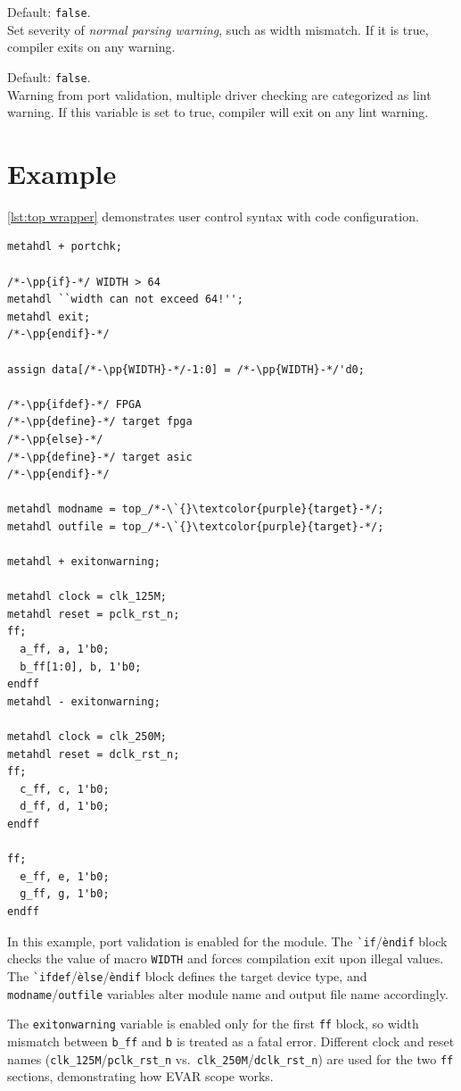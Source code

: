 \begin{description}[style=nextline,leftmargin=2em]
\item[\texttt{exitonwarning}\hfill EVAR\,/\,boolean]
Default: \texttt{false}.\\
Set severity of \emph{normal parsing warning}, such as width mismatch.
If it is true, compiler exits on any warning.

\item[\texttt{exitonlintwarning}\hfill MVAR\,/\,boolean]
Default: \texttt{false}.\\
Warning from port validation, multiple driver checking are categorized
as lint warning. If this variable is set to true, compiler will exit
on any lint warning.

\end{description}

\section{Example}
\autoref{lst:top wrapper} demonstrates user control syntax with
code configuration.

\begin{lstlisting}[caption={Demo Top Wrapper}, label={lst:top wrapper}]
metahdl + portchk;

/*-\pp{if}-*/ WIDTH > 64
metahdl ``width can not exceed 64!'';
metahdl exit;
/*-\pp{endif}-*/

assign data[/*-\pp{WIDTH}-*/-1:0] = /*-\pp{WIDTH}-*/'d0;

/*-\pp{ifdef}-*/ FPGA
/*-\pp{define}-*/ target fpga
/*-\pp{else}-*/
/*-\pp{define}-*/ target asic
/*-\pp{endif}-*/

metahdl modname = top_/*-\`{}\textcolor{purple}{target}-*/;
metahdl outfile = top_/*-\`{}\textcolor{purple}{target}-*/;

metahdl + exitonwarning;

metahdl clock = clk_125M;
metahdl reset = pclk_rst_n;
ff;
  a_ff, a, 1'b0;
  b_ff[1:0], b, 1'b0;
endff
metahdl - exitonwarning;

metahdl clock = clk_250M;
metahdl reset = dclk_rst_n;
ff;
  c_ff, c, 1'b0;
  d_ff, d, 1'b0;
endff

ff;
  e_ff, e, 1'b0;
  g_ff, g, 1'b0;
endff
\end{lstlisting}

In this example, port validation is enabled for the module.
The \texttt{\`{}if}/\texttt{\`endif} block checks the value of macro \texttt{WIDTH}
and forces compilation exit upon illegal values.
The \texttt{\`{}ifdef}/\texttt{\`else}/\texttt{\`endif} block defines the target device
type, and \texttt{modname}/\texttt{outfile} variables alter \sv{} module name and
output file name accordingly.

The \texttt{exitonwarning} variable is enabled only for the first \texttt{ff} block,
so width mismatch between \verb|b_ff| and \verb|b| is treated as a fatal error.
Different clock and reset names (\texttt{clk\_125M}/\texttt{pclk\_rst\_n} vs.\
\texttt{clk\_250M}/\texttt{dclk\_rst\_n}) are used for the two \texttt{ff} sections,
demonstrating how EVAR scope works.
